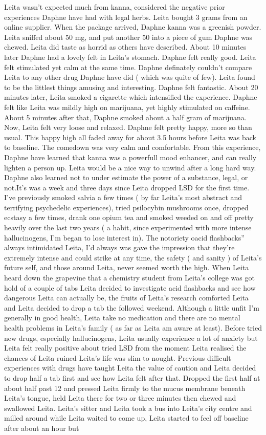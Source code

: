 \documentclass[12pt]{book}
\begin{document}
Leita wasn't expected much from kanna, considered the negative prior experiences Daphne have had with legal herbs. Leita bought 3 grams from an online supplier. When the package arrived, Daphne kanna was a greenish powder. Leita sniffed about 50 mg, and put another 50 into a piece of gum Daphne was chewed. Leita did taste as horrid as others have described. About 10 minutes later Daphne had a lovely felt in Leita's stomach. Daphne felt really good. Leita felt stimulated yet calm at the same time. Daphne definately couldn't compare Leita to any other drug Daphne have did ( which was quite of few). Leita found to be the littlest things amusing and interesting. Daphne felt fantastic. About 20 minutes later, Leita smoked a cigarette which intensified the experience. Daphne felt like Leita was mildly high on marijuana, yet highly stimulated on caffeine. About 5 minutes after that, Daphne smoked about a half gram of marijuana. Now, Leita felt very loose and relaxed. Daphne felt pretty happy, more so than usual. This happy high all faded away for about 3.5 hours before Leita was back to baseline. The comedown was very calm and comfortable. From this experience, Daphne have learned that kanna was a powerfull mood enhancer, and can really lighten a person up. Leita would be a nice way to unwind after a long hard way. Daphne also learned not to under estimate the power of a substance, legal, or not.It's was a week and three days since Leita dropped LSD for the first time. I've previously smoked salvia a few times ( by far Leita's most abstract and terrifying psychedelic experiences), tried psilocybin mushrooms once, dropped ecstasy a few times, drank one opium tea and smoked weeded on and off pretty heavily over the last two years ( a habit, since experimented with more intense hallucinogens, I'm began to lose interest in). The notoriety oacid flashbacks'' always intimidated Leita, I'd always was gave the impression that they're extremely intense and could strike at any time, the safety ( and sanity ) of Leita's future self, and those around Leita, never seemed worth the high. When Leita heard down the grapevine that a chemistry student from Leita's college was got hold of a couple of tabs Leita decided to investigate acid flashbacks and see how dangerous Leita can actually be, the fruits of Leita's research comforted Leita and Leita decided to drop a tab the followed weekend. Although a little unfit I'm generally in good health, Leita take no medication and there are no mental health problems in Leita's family ( as far as Leita am aware at least). Before tried new drugs, especially hallucinogens, Leita usually experience a lot of anxiety but Leita felt really positive about tried LSD from the moment Leita realised the chances of Leita ruined Leita's life was slim to nought. Previous difficult experiences with drugs have taught Leita the value of caution and Leita decided to drop half a tab first and see how Leita felt after that. Dropped the first half at about half past 12 and pressed Leita firmly to the mucus membrane beneath Leita's tongue, held Leita there for two or three minutes then chewed and swallowed Leita. Leita's sitter and Leita took a bus into Leita's city centre and milled around while Leita waited to come up, Leita started to feel off baseline after about an hour but 
\end{document}
